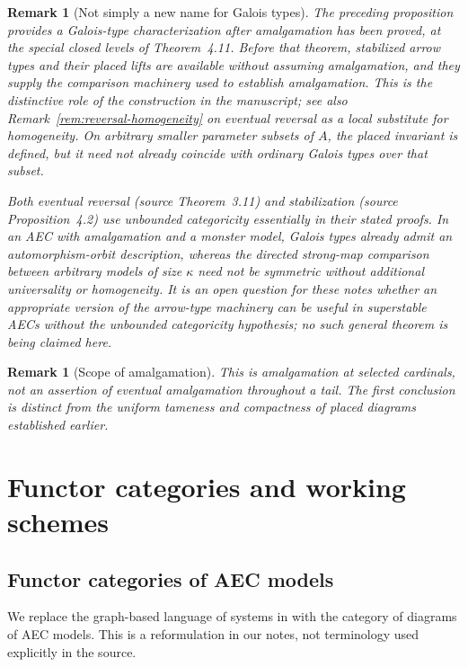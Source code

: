 \documentclass[11pt]{article}
\theoremstyle{plain}
\newtheorem{remark}[definition]{Remark}
\begin{document}
\begin{remark}[Not simply a new name for Galois types]
\label{rem:arrow-novelty}
The preceding proposition provides a
\emph{Galois-type characterization after
amalgamation has been proved}, at the
special closed levels of Theorem~4.11.
Before that theorem, stabilized arrow
types and their placed lifts are available
without assuming amalgamation, and they
supply the comparison machinery used to
\emph{establish} amalgamation. This is
the distinctive role of the construction
in the manuscript; see also
Remark~\ref{rem:reversal-homogeneity}
on eventual reversal as a local substitute
for homogeneity. On arbitrary smaller
parameter subsets of $A$, the placed
invariant is defined, but it need not
already coincide with ordinary Galois
types over that subset.

Both eventual reversal (source Theorem~3.11)
and stabilization (source Proposition~4.2)
use unbounded categoricity essentially
in their stated proofs. In an AEC with
amalgamation and a monster model,
Galois types already admit an automorphism-orbit
description, whereas the directed strong-map
comparison between arbitrary models of size
$\kappa$ need not be symmetric without
additional universality or homogeneity.
It is an open question for these notes
whether an appropriate version of the
arrow-type machinery can be useful in
superstable AECs without the unbounded
categoricity hypothesis; no such general
theorem is being claimed here.
\end{remark}

\begin{remark}[Scope of amalgamation]
This is amalgamation at selected cardinals, not an assertion
of eventual amalgamation throughout a tail. The first conclusion
is distinct from the uniform tameness and compactness of
placed diagrams established earlier.
\end{remark}

\section{Functor categories and working schemes}
\subsection{Functor categories of AEC models}
\label{subsec:functor-aec}
We replace the graph-based language of systems in
\cite[Section 5.1]{oai-ecc} with the category of
diagrams of AEC models. This is a reformulation
in our notes, not terminology used explicitly in the source.
\end{document}
